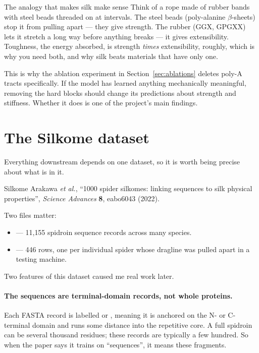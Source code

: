 \begin{keybox}{The analogy that makes silk make sense}
Think of a rope made of rubber bands with steel beads threaded on at intervals.
The steel beads (poly-alanine $\beta$-sheets) stop it from pulling apart --- they
give strength. The rubber (GGX, GPGXX) lets it stretch a long way before
anything breaks --- it gives extensibility. Toughness, the energy absorbed, is
strength \emph{times} extensibility, roughly, which is why you need both, and
why silk beats materials that have only one.
\end{keybox}

This is why the ablation experiment in Section~\ref{sec:ablations} deletes
poly-A tracts specifically. If the model has learned anything mechanically
meaningful, removing the hard blocks should change its predictions about
strength and stiffness. Whether it does is one of the project's main findings.

\section{The Silkome dataset}
\label{sec:silkome}

Everything downstream depends on one dataset, so it is worth being precise
about what is in it.

\begin{keybox}{Silkome}
Arakawa \emph{et al.}, ``1000 spider silkomes: linking sequences to silk
physical properties'', \emph{Science Advances} \textbf{8}, eabo6043 (2022).

Two files matter:
\begin{itemize}[leftmargin=*,itemsep=2pt]
  \item {} --- 11{,}155 spidroin
        sequence records across many species.
  \item {} --- 446 rows, one per individual
        spider whose dragline was pulled apart in a testing machine.
\end{itemize}
\end{keybox}

Two features of this dataset caused me real work later.

\paragraph{The sequences are terminal-domain records, not whole proteins.}
Each FASTA record is labelled  or , meaning it is anchored
on the N- or C-terminal domain and runs some distance into the repetitive core.
A full spidroin can be several thousand residues; these records are typically
a few hundred. So when the paper says it trains on ``sequences'', it means
these fragments.

